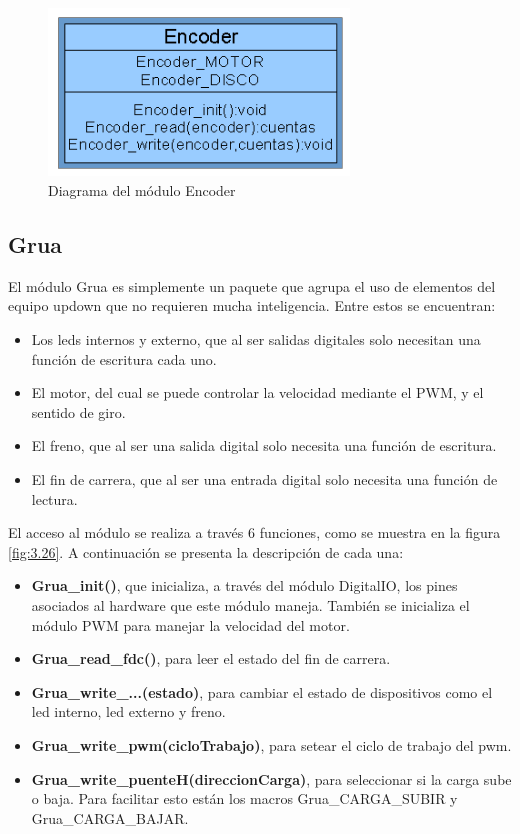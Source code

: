 \begin{figure}[!ht]
	\centering
	\includegraphics[width=8cm,scale=1]{resources/3_25-moduloEncoder.png}
	\caption{Diagrama del módulo Encoder}
	\label{fig:\thefigure}
\end{figure}


\subsection{Grua}
El módulo Grua es simplemente un paquete que agrupa el uso de elementos del equipo updown que no requieren mucha inteligencia. Entre estos se encuentran: 
\begin{itemize}
	\item Los leds internos y externo, que al ser salidas digitales solo necesitan una función de escritura cada uno.
	\item El motor, del cual se puede controlar la velocidad mediante el PWM, y el sentido de giro.
	\item El freno, que al ser una salida digital solo necesita una función de escritura.
	\item El fin de carrera, que al ser una entrada digital solo necesita una función de lectura.
\end{itemize} 

El acceso al módulo se realiza a través 6 funciones, como se muestra en la figura \ref{fig:3.26}. A continuación se presenta la descripción de cada una:
\begin{itemize}
	\item \textbf{Grua\_init()}, que inicializa, a través del módulo DigitalIO, los pines asociados al hardware que este módulo maneja. También se inicializa el módulo PWM para manejar la velocidad del motor.
	\item \textbf{Grua\_read\_fdc()}, para leer el estado del fin de carrera.
	\item \textbf{Grua\_write\_...(estado)}, para cambiar el estado de dispositivos como el led interno, led externo y freno.
	\item \textbf{Grua\_write\_pwm(cicloTrabajo)}, para setear el ciclo de trabajo del pwm.
	\item \textbf{Grua\_write\_puenteH(direccionCarga)}, para seleccionar si la carga sube o baja. Para facilitar esto están los macros Grua\_CARGA\_SUBIR y Grua\_CARGA\_BAJAR.
\end{itemize}

